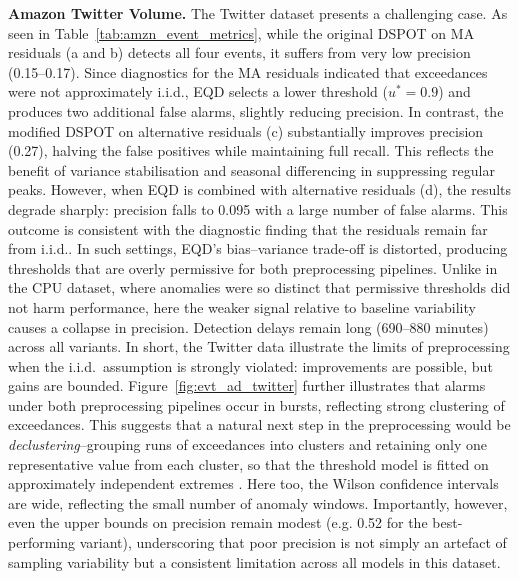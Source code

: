 \documentclass{statsmsc}
\begin{document}
\noindent\textbf{Amazon Twitter Volume.} The Twitter dataset presents a challenging case. 
As seen in Table~\ref{tab:amzn_event_metrics}, while the original DSPOT on MA residuals (a and b) detects all four events,
it suffers from very low precision (0.15–0.17). Since diagnostics for the MA residuals indicated that exceedances were not 
approximately i.i.d., EQD selects a lower threshold ($u^*=0.9$) and produces two additional false alarms, 
slightly reducing precision. In contrast, the modified DSPOT on alternative residuals (c) substantially improves precision (0.27), 
halving the false positives while maintaining full recall. This reflects the benefit of variance stabilisation and seasonal 
differencing in suppressing regular peaks. However, when EQD is combined with alternative residuals (d), the results degrade 
sharply: precision falls to 0.095 with a large number of false alarms. This outcome is consistent with the diagnostic finding
that the residuals remain far from i.i.d.. In such settings, EQD’s bias–variance trade-off is distorted, producing 
thresholds that are overly permissive for both preprocessing pipelines. Unlike in the CPU dataset, where anomalies were so 
distinct that permissive thresholds did not harm performance, here the weaker signal relative to baseline variability causes
a collapse in precision. Detection delays remain long (690–880 minutes) across all variants. In short, the Twitter data 
illustrate the limits of preprocessing when the i.i.d.\ assumption is strongly violated: improvements are possible, 
but gains are bounded. Figure~\ref{fig:evt_ad_twitter} further illustrates that alarms under both preprocessing pipelines 
occur in bursts, reflecting strong clustering of exceedances. This suggests that a natural next step in the preprocessing 
would be \emph{declustering}--grouping runs of exceedances into clusters and retaining only one representative value from each cluster,
so that the threshold model is fitted on approximately independent extremes \citep{Coles2001}. Here too, the Wilson confidence
intervals are wide, reflecting the small number of anomaly windows. Importantly, however, even the upper bounds on precision
remain modest (e.g. 0.52 for the best-performing variant), underscoring that poor precision is not simply an artefact of 
sampling variability but a consistent limitation across all models in this dataset.
\end{document}
